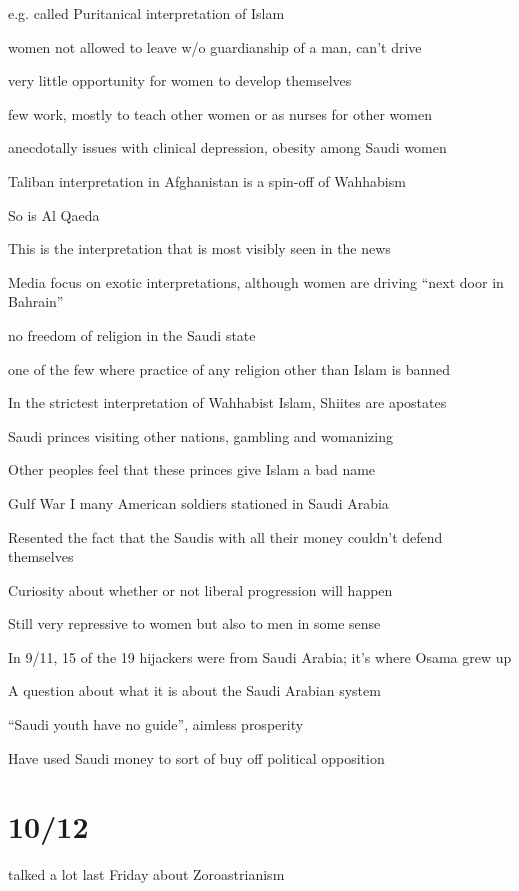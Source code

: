 \documentclass[12pt]{article}
\begin{document}
e.g. called Puritanical interpretation of Islam

women not allowed to leave w/o guardianship of a man, can't drive

very little opportunity for women to develop themselves

few work, mostly to teach other women or as nurses for other women

anecdotally issues with clinical depression, obesity among Saudi women

Taliban interpretation in Afghanistan is a spin-off of Wahhabism

So is Al Qaeda

This is the interpretation that is most visibly seen in the news

Media focus on exotic interpretations, although women are driving ``next door in Bahrain''

no freedom of religion in the Saudi state

one of the few where practice of any religion other than Islam is banned

In the strictest interpretation of Wahhabist Islam, Shiites are apostates

Saudi princes visiting other nations, gambling and womanizing

Other peoples feel that these princes give Islam a bad name

Gulf War I many American soldiers stationed in Saudi Arabia

Resented the fact that the Saudis with all their money couldn't defend themselves

Curiosity about whether or not liberal progression will happen

Still very repressive to women but also to men in some sense

In 9/11, 15 of the 19 hijackers were from Saudi Arabia; it's where Osama grew up

A question about what it is about the Saudi Arabian system

``Saudi youth have no guide'', aimless prosperity

Have used Saudi money to sort of buy off political opposition

\section{10/12}

\noindent
talked a lot last Friday about Zoroastrianism\\
\end{document}
